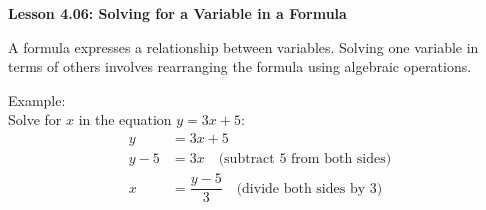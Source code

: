 \begin{center}
\textbf{Lesson 4.06: Solving for a Variable in a Formula}
\end{center}

\vspace*{-1.5ex}

A formula expresses a relationship between variables. Solving one variable in terms of others involves rearranging the formula using algebraic operations.

\noindent Example:\\
Solve for \(x\) in the equation \(y = 3x + 5\):
\[
\begin{aligned}
    y &= 3x + 5 \\
    y - 5 &= 3x \quad \text{(subtract 5 from both sides)} \\
    x &= \dfrac{y - 5}{3} \quad \text{(divide both sides by 3)}
\end{aligned}
\]
